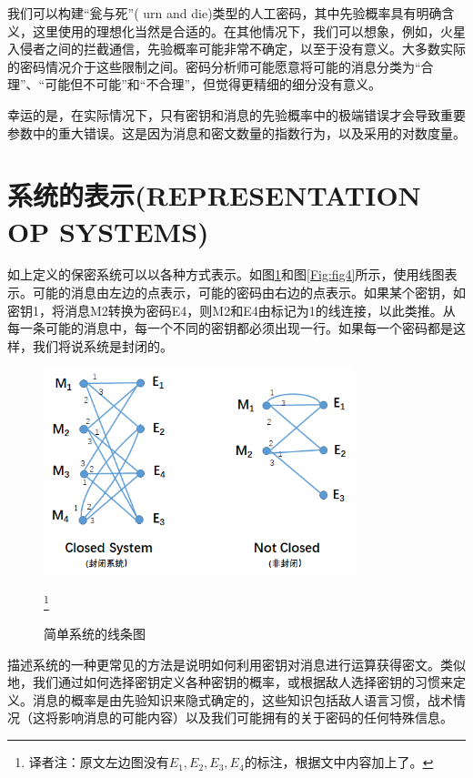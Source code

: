 \documentclass[]{article}
\begin{document}
我们可以构建“瓮与死”( urn and die)类型的人工密码，其中先验概率具有明确含义，这里使用的理想化当然是合适的。在其他情况下，我们可以想象，例如，火星入侵者之间的拦截通信，先验概率可能非常不确定，以至于没有意义。大多数实际的密码情况介于这些限制之间。密码分析师可能愿意将可能的消息分类为“合理”、“可能但不可能”和“不合理”，但觉得更精细的细分没有意义。

幸运的是，在实际情况下，只有密钥和消息的先验概率中的极端错误才会导致重要参数中的重大错误。这是因为消息和密文数量的指数行为，以及采用的对数度量。

\newpage

%   
%

\section{系统的表示(REPRESENTATION OP SYSTEMS)}
如上定义的保密系统可以以各种方式表示。如图\ref{Fig:fig2}和图\ref{Fig:fig4}所示，使用线图表示。可能的消息由左边的点表示，可能的密码由右边的点表示。如果某个密钥，如密钥1，将消息M2转换为密码E4，则M2和E4由标记为1的线连接，以此类推。从每一条可能的消息中，每一个不同的密钥都必须出现一行。如果每一个密码都是这样，我们将说系统是封闭的。

\begin{figure}[htbp]
	\centering
	\includegraphics[width=0.8\textwidth]{fig-2.png}
	\caption{简单系统的线条图}\footnote{译者注：原文左边图没有$E_1,E_2,E_3,E_4$的标注，根据文中内容加上了。}
	\label{Fig:fig2}
\end{figure}

描述系统的一种更常见的方法是说明如何利用密钥对消息进行运算获得密文。类似地，我们通过如何选择密钥定义各种密钥的概率，或根据敌人选择密钥的习惯来定义。消息的概率是由先验知识来隐式确定的，这些知识包括敌人语言习惯，战术情况（这将影响消息的可能内容）以及我们可能拥有的关于密码的任何特殊信息。
\end{document}
